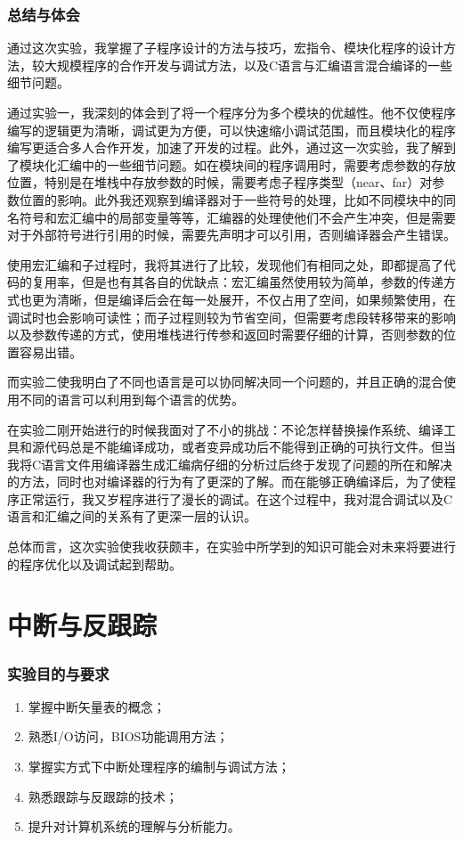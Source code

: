 \documentclass{article}
\begin{document}
	\section{总结与体会}
	通过这次实验，我掌握了子程序设计的方法与技巧，宏指令、模块化程序的设计方法，较大规模程序的合作开发与调试方法，以及C语言与汇编语言混合编译的一些细节问题。\par
	通过实验一，我深刻的体会到了将一个程序分为多个模块的优越性。他不仅使程序编写的逻辑更为清晰，调试更为方便，可以快速缩小调试范围，而且模块化的程序编写更适合多人合作开发，加速了开发的过程。此外，通过这一次实验，我了解到了模块化汇编中的一些细节问题。如在模块间的程序调用时，需要考虑参数的存放位置，特别是在堆栈中存放参数的时候，需要考虑子程序类型（near、far）对参数位置的影响。此外我还观察到编译器对于一些符号的处理，比如不同模块中的同名符号和宏汇编中的局部变量等等，汇编器的处理使他们不会产生冲突，但是需要对于外部符号进行引用的时候，需要先声明才可以引用，否则编译器会产生错误。\par
	使用宏汇编和子过程时，我将其进行了比较，发现他们有相同之处，即都提高了代码的复用率，但是也有其各自的优缺点：宏汇编虽然使用较为简单，参数的传递方式也更为清晰，但是编译后会在每一处展开，不仅占用了空间，如果频繁使用，在调试时也会影响可读性；而子过程则较为节省空间，但需要考虑段转移带来的影响以及参数传递的方式，使用堆栈进行传参和返回时需要仔细的计算，否则参数的位置容易出错。\par
	而实验二使我明白了不同也语言是可以协同解决同一个问题的，并且正确的混合使用不同的语言可以利用到每个语言的优势。\par
	在实验二刚开始进行的时候我面对了不小的挑战：不论怎样替换操作系统、编译工具和源代码总是不能编译成功，或者变异成功后不能得到正确的可执行文件。但当我将C语言文件用编译器生成汇编病仔细的分析过后终于发现了问题的所在和解决的方法，同时也对编译器的行为有了更深的了解。而在能够正确编译后，为了使程序正常运行，我又岁程序进行了漫长的调试。在这个过程中，我对混合调试以及C语言和汇编之间的关系有了更深一层的认识。 \par
	总体而言，这次实验使我收获颇丰，在实验中所学到的知识可能会对未来将要进行的程序优化以及调试起到帮助。

\newpage
\part{中断与反跟踪}
	\section{实验目的与要求}
	\begin{enumerate}
		\item 掌握中断矢量表的概念；
		\item 熟悉I/O访问，BIOS功能调用方法；
		\item 掌握实方式下中断处理程序的编制与调试方法；
		\item 熟悉跟踪与反跟踪的技术；
		\item 提升对计算机系统的理解与分析能力。
	\end{enumerate}
\end{document}
